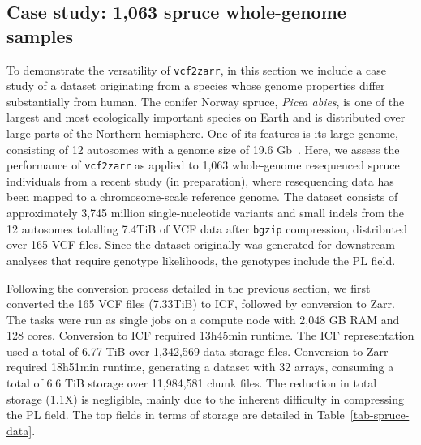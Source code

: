 \documentclass[a4paper,num-refs]{oup-contemporary}
\begin{document}
\subsection{Case study: 1,063 spruce whole-genome samples}

To demonstrate the versatility of \texttt{vcf2zarr}, in this section
we include a case study of a dataset originating from a species whose
genome properties differ substantially from human. The conifer Norway
spruce, \emph{Picea abies}, is one of the largest and most
ecologically important species on Earth and is distributed over large
parts of the Northern hemisphere. One of its features is its large
genome, consisting of 12 autosomes with a genome size of 19.6
Gb~\cite{nystedt_NorwaySpruceGenome_2013}. Here, we assess the
performance of \texttt{vcf2zarr} as applied to 1,063 whole-genome
resequenced spruce individuals from a recent study (in preparation),
where resequencing data has been mapped to a chromosome-scale
reference genome. The dataset consists of approximately 3,745 million
single-nucleotide variants and small indels from the 12 autosomes
totalling 7.4TiB of VCF data after \texttt{bgzip} compression,
distributed over 165 VCF files. Since the dataset originally was
generated for downstream analyses that require genotype likelihoods,
the genotypes include the PL field.

Following the conversion process detailed in the previous section, we
first converted the 165 VCF files (7.33TiB) to ICF, followed by
conversion to Zarr. The tasks were run as single jobs on a compute
node with 2,048 GB RAM and 128 cores. Conversion to ICF required
13h45min runtime. The ICF representation used a total of 6.77 TiB over
1,342,569 data storage files. Conversion to Zarr required 18h51min
runtime, generating a dataset with 32 arrays, consuming a total of 6.6
TiB storage over 11,984,581 chunk files. The reduction in total
storage (1.1X) is negligible, mainly due to the inherent difficulty in
compressing the PL field. The top fields in terms of storage are
detailed in Table~\ref{tab-spruce-data}.
\end{document}
